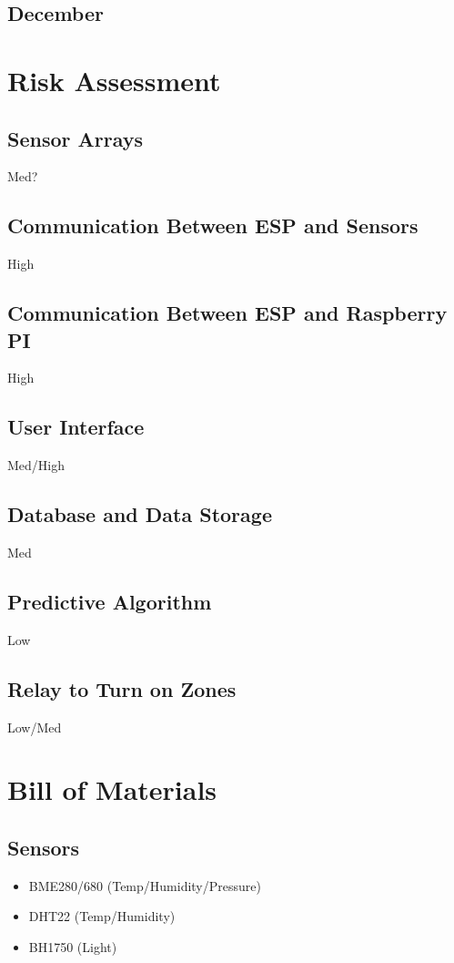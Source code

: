 \documentclass[letterpaper, 10 pt, conference]{ieeeconf}  %
\begin{document}
\subsection{December}

\section{Risk Assessment}
\subsection{Sensor Arrays}
Med?

\subsection{Communication Between ESP and Sensors}
High

\subsection{Communication Between ESP and Raspberry PI}
High

\subsection{User Interface}
Med/High

\subsection{Database and Data Storage}
Med

\subsection{Predictive Algorithm}
Low

\subsection{Relay to Turn on Zones}
Low/Med

\section{Bill of Materials}
\subsection{Sensors}
\begin{itemize}
  \item BME280/680 (Temp/Humidity/Pressure)
  \item DHT22 (Temp/Humidity)
  \item BH1750 (Light)
\end{itemize}
\end{document}
